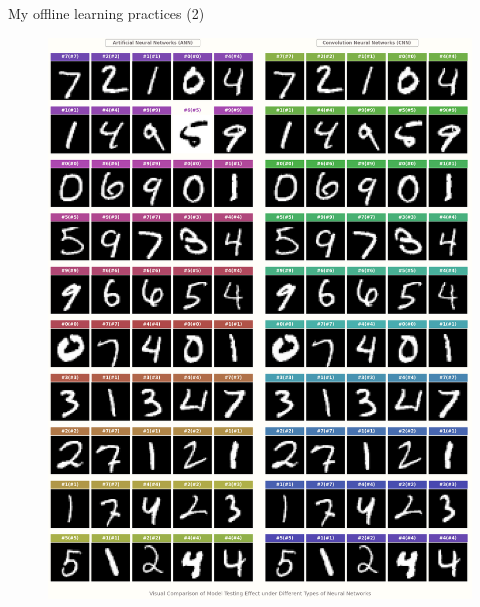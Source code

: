 \documentclass{beamer}
\begin{document}
	\begin{frame}[fragile]{My offline learning practices (2)}
		\begin{figure}[!htb]
			\centering\includegraphics[width=\linewidth]{images/deep_learning_1.png}
			\endminipage\hfill

\end{figure}
\end{frame}
\end{document}

